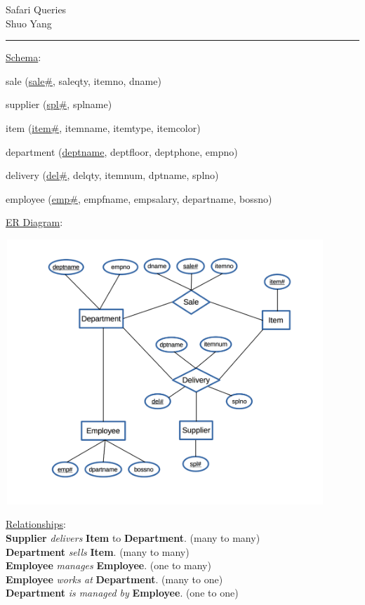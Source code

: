 \documentclass[10pt]{article}
\def\Author{Shuo Yang}
\begin{document}
\noindent

\begin{center}
  Safari Queries\\
  \Author\\
\end{center}

\hrule\smallskip

\vspace{1em}
\underline{Schema}:
\vspace{1em}

sale (\underline{sale\#}, saleqty, itemno, dname)

supplier (\underline{spl\#}, splname)

item (\underline{item\#}, itemname, itemtype, itemcolor)

department (\underline{deptname}, deptfloor, deptphone, empno)

delivery (\underline{del\#}, delqty, itemnum, dptname, splno)

employee (\underline{emp\#}, empfname, empsalary, departname, bossno)

\vspace{1em}

\underline{ER Diagram}:
\begin{center}
  \includegraphics[width=12cm,height=10cm]{./safari-ER.png}
\end{center}

\underline{Relationships}:\\
\textbf{Supplier} \emph{delivers} \textbf{Item} to
\textbf{Department}. (many to many)\\
\textbf{Department} \emph{sells} \textbf{Item}. (many to many)\\
\textbf{Employee} \emph{manages} \textbf{Employee}. (one to many)\\
\textbf{Employee} \emph{works at} \textbf{Department}. (many to one)\\
\textbf{Department} \emph{is managed by} \textbf{Employee}. (one to one)\\
\end{document}
